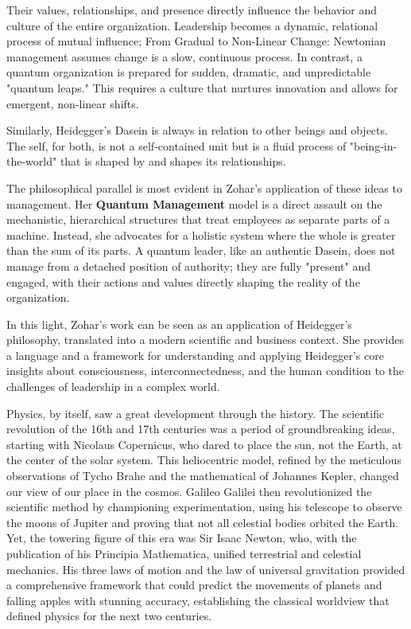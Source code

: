 \documentclass{article}
\begin{document}
Their values, relationships, and presence directly influence the behavior and culture of the entire organization. Leadership becomes a dynamic, relational process of mutual influence; From Gradual to Non-Linear Change: Newtonian management assumes change is a slow, continuous process. In contrast, a quantum organization is prepared for sudden, dramatic, and unpredictable "quantum leaps." This requires a culture that nurtures innovation and allows for emergent, non-linear shifts.

Similarly, Heidegger’s Dasein \cite{heidegger1962being} is always in relation to other beings and objects. The self, for both, is not a self-contained unit but is a fluid process of "being-in-the-world" that is shaped by and shapes its relationships.

The philosophical parallel is most evident in Zohar's application of these ideas to management. Her \textbf{Quantum Management} model is a direct assault on the mechanistic, hierarchical structures that treat employees as separate parts of a machine. Instead, she advocates for a holistic system where the whole is greater than the sum of its parts. A quantum leader, like an authentic Dasein, does not manage from a detached position of authority; they are fully "present" and engaged, with their actions and values directly shaping the reality of the organization.

In this light, Zohar's work can be seen as an application of Heidegger's philosophy, translated into a modern scientific and business context. She provides a language and a framework for understanding and applying Heidegger's core insights about consciousness, interconnectedness, and the human condition to the challenges of leadership in a complex world.

Physics, by itself, saw a great development through the history.
The scientific revolution of the 16th and 17th centuries was a period of groundbreaking ideas, starting with Nicolaus Copernicus, who dared to place the sun, not the Earth, at the center of the solar system. This heliocentric model, refined by the meticulous observations of Tycho Brahe and the mathematical of Johannes Kepler, changed our view of our place in the cosmos. Galileo Galilei then revolutionized the scientific method by championing experimentation, using his telescope to observe the moons of Jupiter and proving that not all celestial bodies orbited the Earth. Yet, the towering figure of this era was Sir Isaac Newton, who, with the publication of his Principia Mathematica, unified terrestrial and celestial mechanics. His three laws of motion and the law of universal gravitation provided a comprehensive framework that could predict the movements of planets and falling apples with stunning accuracy, establishing the classical worldview that defined physics for the next two centuries.
\end{document}
